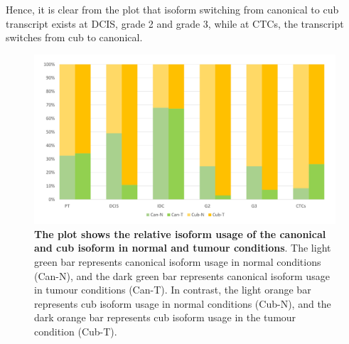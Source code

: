 \documentclass[fleqn,10pt,lineno]{wlpeerj}
\begin{document}
Hence, it is clear from the plot that isoform switching from canonical to cub transcript exists at DCIS, grade 2 and grade 3, while at CTCs, the transcript switches from cub to canonical.


\begin{figure}[ht] %
\centering
\captionsetup{justification=centering}
\vspace{.5cm} %
\begin{flushright}
\includegraphics[width=150mm]{Figure3.pdf}
\caption{\textbf{The plot shows the relative isoform usage of the canonical and cub isoform in normal and tumour conditions}. The light green bar represents canonical isoform usage in normal conditions (Can-N), and the dark green bar represents canonical isoform usage in tumour conditions (Can-T). In contrast, the light orange bar represents cub isoform usage in normal conditions (Cub-N), and the dark orange bar represents cub isoform usage in the tumour condition (Cub-T).
\label{fig3}} %
\end{flushright}
\end{figure}
\end{document}
